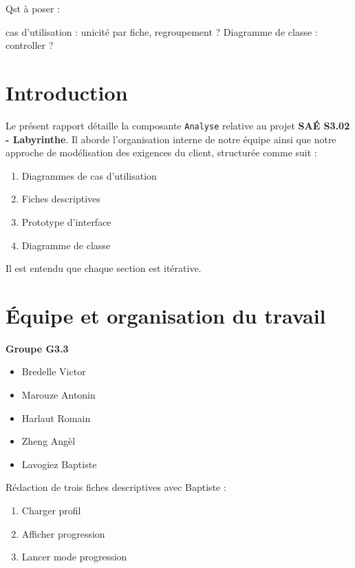 \documentclass{butexFR}
\begin{document}
\fairepagedegarde
\fairemarges
\tabledematieres



Qst à poser :

cas d'utilisation : unicité par fiche, regroupement ?
Diagramme de classe : controller ?


\section{Introduction}

Le présent rapport détaille la composante \texttt{Analyse} relative au projet \textbf{SAÉ S3.02 - Labyrinthe}. Il aborde l'organisation interne de notre équipe ainsi que notre approche de modélisation des exigences du client, structurée comme suit :

\begin{enumerate}
    \item Diagrammes de cas d'utilisation
    \item Fiches descriptives
    \item Prototype d'interface
    \item Diagramme de classe
\end{enumerate}

Il est entendu que chaque section est itérative.

\section{Équipe et organisation du travail}
\textbf{Groupe G3.3}

\begin{itemize}
    \item Bredelle Victor
    \item Marouze Antonin
    \item Harlaut Romain
    \item Zheng Angèl
    \item Lavogiez Baptiste
\end{itemize}


Rédaction de trois fiches descriptives avec Baptiste :
\begin{enumerate}
    \item Charger profil
    \item Afficher progression
    \item Lancer mode progression
\end{enumerate}
\end{document}
